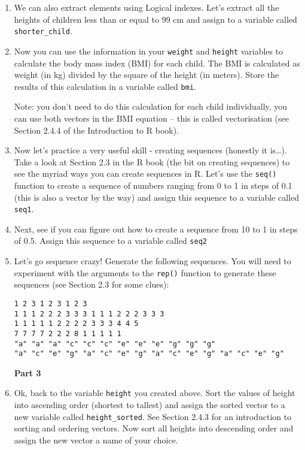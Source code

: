 \documentclass[12pt]{article}
\newcommand{\lst}[1]{\lstinline{#1}}
\begin{document}
\begin{enumerate}
\item We can also extract elements using Logical indexes. Let’s extract all the heights of children less than or equal to 99 cm and assign to a variable called \lst{shorter_child}.

 

\item Now you can use the information in your \lst{weight} and \lst{height} variables to calculate the body mass index (BMI) for each child. The BMI is calculated as weight (in kg) divided by the square of the height (in meters). Store the results of this calculation in a variable called \lst{bmi}. 

Note: you don’t need to do this calculation for each child individually, you can use both vectors in the BMI equation – this is called vectorisation (see Section 2.4.4 of the Introduction to R book).

 

\item Now let’s practice a very useful skill - creating sequences (honestly it is…). Take a look at Section 2.3 in the R book (the bit on creating sequences) to see the myriad ways you can create sequences in R. Let’s use the 
\lst{seq()} function to create a sequence of numbers ranging from 0 to 1 in steps of 0.1 (this is also a vector by the way) and assign this sequence to a variable called \lst{seq1}.

 

\item Next, see if you can figure out how to create a sequence from 10 to 1 in steps of 0.5. Assign this sequence to a variable called \lst{seq2}
 

\item Let’s go sequence crazy! Generate the following sequences. You will need to experiment with the arguments to the \lst{rep()} function to generate these sequences (see Section 2.3 for some clues):
\begin{verbatim}
1 2 3 1 2 3 1 2 3
1 1 1 2 2 2 3 3 3 1 1 1 2 2 2 3 3 3
1 1 1 1 1 2 2 2 2 3 3 3 4 4 5
7 7 7 7 2 2 2 8 1 1 1 1 1
"a" "a" "a" "c" "c" "c" "e" "e" "e" "g" "g" "g"
"a" "c" "e" "g" "a" "c" "e" "g" "a" "c" "e" "g" "a" "c" "e" "g"

\end{verbatim}
 


\centerline{\bf Part 3}

\item Ok, back to the variable \lst{height} you created above. Sort the values of height into ascending order (shortest to tallest) and assign the sorted vector to a new variable called \lst{height_sorted}. See Section 2.4.3 for an introduction to sorting and ordering vectors. Now sort all heights into descending order and assign the new vector a name of your choice.


\end{enumerate}
\end{document}
